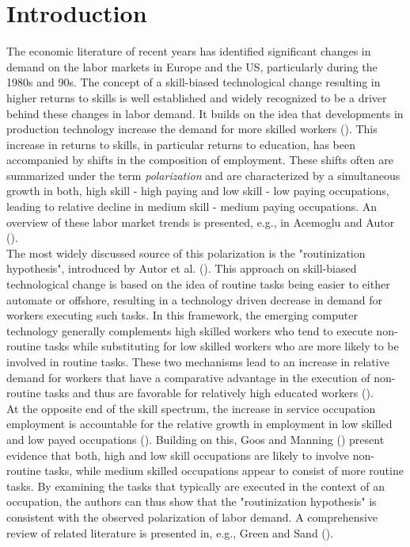 \documentclass[../main.tex]{subfiles}
\begin{document}
\section{Introduction}
\label{sec:introduction}
The economic literature of recent years has identified significant changes in demand on the labor markets in Europe and the US, particularly during the 1980s and 90s. The concept of a skill-biased technological change resulting in higher returns to skills is well established and widely recognized to be a driver behind these changes in labor demand. It builds on the idea that developments in production technology increase the demand for more skilled workers (\cite{acemoglu2011skills}). This increase in returns to skills, in particular returns to education, has been accompanied by shifts in the composition of employment. These shifts often are summarized under the term \textit{polarization} and are characterized by a simultaneous growth in both, high skill - high paying and low skill - low paying occupations, leading to relative decline in medium skill - medium paying occupations. An overview of these labor market trends is presented, e.g., in Acemoglu and Autor (\citeyear{acemoglu2011skills}).
\\
The most widely discussed source of this polarization is the "routinization hypothesis", introduced by Autor et al. (\citeyear{autor2003skill}). This approach on skill-biased technological change is based on the idea of routine tasks being easier to either automate or offshore, resulting in a technology driven decrease in demand for workers executing such tasks. In this framework, the emerging computer technology generally complements high skilled workers who tend to execute non-routine tasks while substituting for low skilled workers who are more likely to be involved in routine tasks. These two mechanisms lead to an increase in relative demand for workers that have a comparative advantage in the execution of non-routine tasks and thus are favorable for relatively high educated workers (\cite{autor2003skill}). 
\\
At the opposite end of the skill spectrum, the increase in service occupation employment is accountable for the relative growth in employment in low skilled and low payed occupations (\cite{autor2010inequality}). Building on this, Goos and Manning (\citeyear{goos2007lousy}) present evidence that both, high and low skill occupations are likely to involve non-routine tasks, while medium skilled occupations appear to consist of more routine tasks. By examining the tasks that typically are executed in the context of an occupation, the authors can thus show that the "routinization hypothesis" is consistent with the observed polarization of labor demand. A comprehensive review of related literature is presented in, e.g., Green and Sand (\citeyear{green2015has}).
\end{document}
